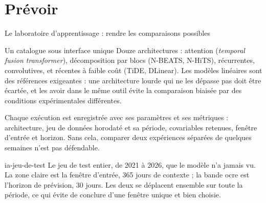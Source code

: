 \documentclass[aspectratio=169,11pt]{beamer}
\begin{document}
\section{Prévoir}
\begin{frame}{Le laboratoire d'apprentissage : rendre les comparaisons possibles}

\small
\begin{apport}{Un catalogue sous interface unique}
Douze architectures : attention (\emph{temporal fusion transformer}), décomposition par blocs
(N-BEATS, N-HiTS), récurrentes, convolutives, et récentes à faible coût (TiDE, DLinear). Les
modèles linéaires sont des références exigeantes : une architecture lourde qui ne les dépasse pas
doit être écartée, et les avoir dans le même outil évite la comparaison biaisée par des
conditions expérimentales différentes.
\end{apport}

\vspace{0.1cm}

\vspace{0.12cm}
{\scriptsize\color{grisardoise} Chaque exécution est enregistrée avec ses paramètres et ses
métriques : architecture, jeu de données horodaté et sa période, covariables retenues, fenêtre
d'entrée et horizon. Sans cela, comparer deux expériences séparées de quelques semaines n'est pas
défendable.\par}
\end{frame}

{ia-jeu-de-test}
{Le jeu de test entier, de 2021 à 2026, que le modèle n'a jamais vu. La zone claire est la
fenêtre d'entrée, 365 jours de contexte ; la bande ocre est l'horizon de prévision, 30 jours. Les
deux se déplacent ensemble sur toute la période, ce qui évite de conclure d'une fenêtre unique et
bien choisie.}


\end{document}
